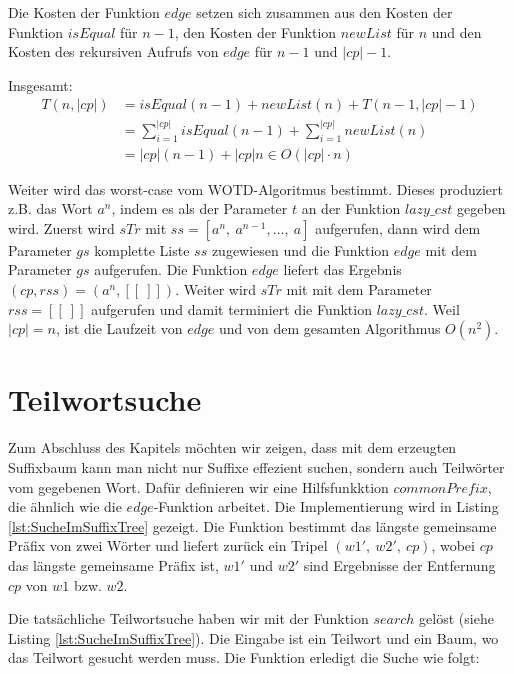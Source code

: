 \documentclass[12pt]{report}
\newcommand{\abs}[1]{\left|#1\right|}
\begin{document}
Die Kosten der Funktion $edge$ setzen sich zusammen aus den Kosten der Funktion $isEqual$ für $n - 1$, den Kosten der Funktion $newList$ für $n$ und den Kosten des rekursiven Aufrufs von $edge$ für $n - 1$ und $\abs{cp} - 1$.

Insgesamt:
\begin{align*}
    T(n,\abs{cp}) &= isEqual(n - 1) + newList(n) + T(n-1,\abs{cp}-1) \\
                  &= \sum_{i = 1}^{\abs{cp}}{isEqual(n-1)} + \sum_{i = 1}^{\abs{cp}}{newList(n)}\\
                  &= \abs{cp} (n - 1) + \abs{cp} n \in O(\abs{cp} \cdot n)
\end{align*}

Weiter wird das worst-case vom WOTD-Algoritmus bestimmt. Dieses produziert z.B. das Wort $a^n$, indem es als der Parameter $t$ an der Funktion $lazy\_cst$ gegeben wird. Zuerst wird $sTr$ mit $ss = [a^n,\:a^{n-1}, \dots ,\:a]$ aufgerufen, dann wird dem Parameter $gs$ komplette Liste $ss$ zugewiesen und die Funktion $edge$ mit dem Parameter $gs$ aufgerufen. Die Funktion $edge$ liefert das Ergebnis $(cp,rss) = (a^n, [[\:]])$. Weiter wird $sTr$ mit mit dem Parameter $rss = [[\:]]$ aufgerufen und damit terminiert die Funktion $lazy\_cst$. Weil $|cp| = n$, ist die Laufzeit von $edge$ und von dem gesamten Algorithmus $O(n^2)$.

\section{Teilwortsuche}
\label{sec:Teilwortsuche}

Zum Abschluss des Kapitels möchten wir zeigen, dass mit dem erzeugten Suffixbaum kann man nicht nur Suffixe effezient suchen, sondern auch Teilwörter vom gegebenen Wort. Dafür definieren wir eine Hilfsfunkktion $commonPrefix$, die ähnlich wie die $edge$-Funktion arbeitet. Die Implementierung wird in Listing \ref{lst:SucheImSuffixTree} gezeigt. Die Funktion bestimmt das längste gemeinsame Präfix von zwei Wörter und liefert zurück ein Tripel $(w1',\: w2',\: cp)$, wobei $cp$ das längste gemeinsame Präfix ist, $w1'$ und $w2'$ sind Ergebnisse der Entfernung $cp$ von $w1$ bzw. $w2$.

Die tatsächliche Teilwortsuche haben wir mit der Funktion $search$ gelöst (siehe Listing \ref{lst:SucheImSuffixTree}). Die Eingabe ist ein Teilwort und ein Baum, wo das Teilwort gesucht werden muss. Die Funktion erledigt die Suche wie folgt:
\end{document}
